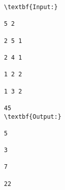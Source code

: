 \begin{verbatim}
\textbf{Input:}

5 2

2 5 1

2 4 1

1 2 2

1 3 2

45
\textbf{Output:}

5

3

7

22\end{verbatim}
